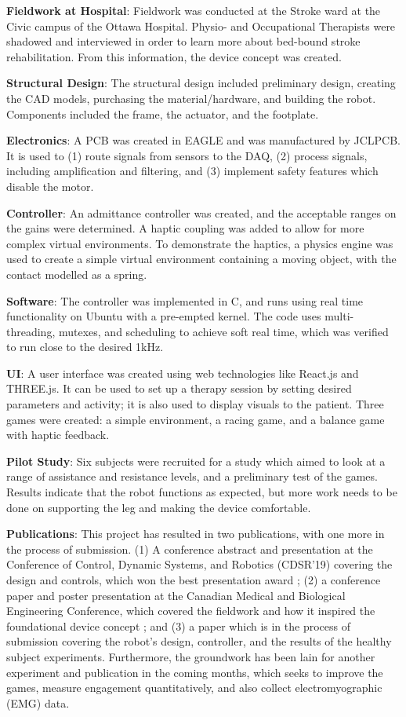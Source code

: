 \documentclass[12pt]{report}
\begin{document}
	\textbf{Fieldwork at Hospital}: Fieldwork was conducted at the Stroke ward at the Civic campus of the Ottawa Hospital. Physio- and Occupational Therapists were shadowed and interviewed in order to learn more about bed-bound stroke rehabilitation. From this information, the device concept was created.
	
	\textbf{Structural Design}: The structural design included preliminary design, creating the CAD models, purchasing the material/hardware, and building the robot. Components included the frame, the actuator, and the footplate. 
	
	\textbf{Electronics}: A PCB was created in EAGLE and was manufactured by JCLPCB. It is used to (1) route signals from sensors to the DAQ, (2) process signals, including amplification and filtering, and (3) implement safety features which disable the motor. 
	
	\textbf{Controller}: An admittance controller was created, and the acceptable ranges on the gains were determined. A haptic coupling was added to allow for more complex virtual environments. To demonstrate the haptics, a physics engine was used to create a simple virtual environment containing  a moving object, with the contact modelled as a spring.  
	
	\textbf{Software}: The controller was implemented in C, and runs using real time functionality on Ubuntu with a pre-empted kernel. The code uses multi-threading, mutexes, and scheduling to achieve soft real time, which was verified to run close to the desired 1kHz. 
	
	\textbf{UI}: A user interface was created using web technologies like React.js and THREE.js. It can be used to set up a therapy session by setting desired parameters and activity; it is also used to display visuals to the patient. Three games were created: a simple environment, a racing game, and a balance game with haptic feedback. 
	
	\textbf{Pilot Study}: Six subjects were recruited for a study which aimed to look at a range of assistance and resistance levels, and a preliminary test of the games. Results indicate that the robot functions as expected, but more work needs to be done on supporting the leg and making the device comfortable. 
	
	\textbf{Publications}: This project has resulted in two publications, with one more in the process of submission. (1) A conference abstract and presentation at the Conference of Control, Dynamic Systems, and Robotics (CDSR'19) covering the design and controls, which won the best presentation award \cite{Berezny2019}; (2) a conference paper and poster presentation at the Canadian Medical and Biological Engineering Conference, which covered the fieldwork and how it inspired the foundational device concept \cite{NBerezny2019}; and (3) a paper which is in the process of submission covering the robot's design, controller, and the results of the healthy subject experiments. Furthermore, the groundwork has been lain for another experiment and publication in the coming months, which seeks to improve the games, measure engagement quantitatively, and also collect electromyographic (EMG) data. 
	
\end{document}
